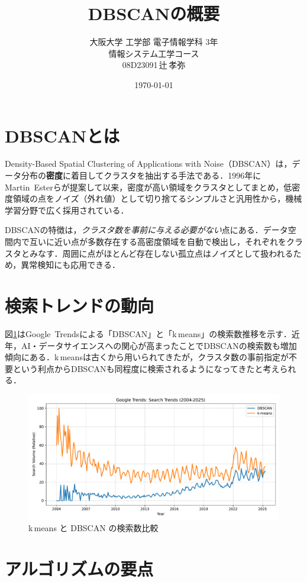 \documentclass[a4j]{jsarticle}
\title{DBSCANの概要}
\author{大阪大学 工学部 電子情報学科 3年\\情報システム工学コース\\08D23091\,辻\,孝弥}
\date{\today}
\begin{document}
\maketitle

\section{DBSCANとは}

Density-Based Spatial Clustering of Applications with Noise（DBSCAN）は，データ分布の\textbf{密度}に着目してクラスタを抽出する手法である．1996年にMartin~Esterらが提案して以来，密度が高い領域をクラスタとしてまとめ，低密度領域の点をノイズ（外れ値）として切り捨てるシンプルさと汎用性から，機械学習分野で広く採用されている．

DBSCANの特徴は，\emph{クラスタ数を事前に与える必要がない}点にある．データ空間内で互いに近い点が多数存在する高密度領域を自動で検出し，それぞれをクラスタとみなす．周囲に点がほとんど存在しない孤立点はノイズとして扱われるため，異常検知にも応用できる．

\section{検索トレンドの動向}
図\ref{fig:trends}はGoogle~Trendsによる「DBSCAN」と「k\,\-means」の検索数推移を示す．近年，AI・データサイエンスへの関心が高まったことでDBSCANの検索数も増加傾向にある．k\,\-meansは古くから用いられてきたが，クラスタ数の事前指定が不要という利点からDBSCANも同程度に検索されるようになってきたと考えられる．

\begin{figure}[htbp]
  \centering
  \includegraphics[width=\textwidth]{trends_comparison.pdf}
  \caption{k\,\-means と DBSCAN の検索数比較}
  \label{fig:trends}
\end{figure}

\section{アルゴリズムの要点}
\end{document}
